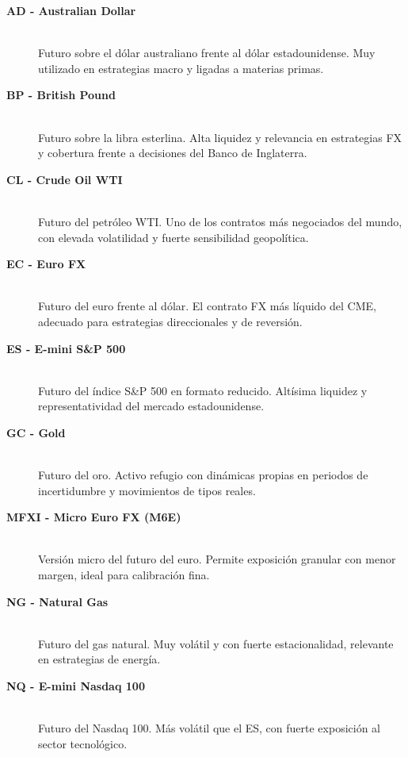 \begin{description}

    \item[\textbf{AD - Australian Dollar}] \hfill \\
    Futuro sobre el dólar australiano frente al dólar estadounidense. Muy utilizado en estrategias macro y ligadas a materias primas.

    \item[\textbf{BP - British Pound}] \hfill \\
    Futuro sobre la libra esterlina. Alta liquidez y relevancia en estrategias FX y cobertura frente a decisiones del Banco de Inglaterra.

    \item[\textbf{CL - Crude Oil WTI}] \hfill \\
    Futuro del petróleo WTI. Uno de los contratos más negociados del mundo, con elevada volatilidad y fuerte sensibilidad geopolítica.

    \item[\textbf{EC - Euro FX}] \hfill \\
    Futuro del euro frente al dólar. El contrato FX más líquido del CME, adecuado para estrategias direccionales y de reversión.

    \item[\textbf{ES - E-mini S\&P 500}] \hfill \\
    Futuro del índice S\&P 500 en formato reducido. Altísima liquidez y representatividad del mercado estadounidense.

    \item[\textbf{GC - Gold}] \hfill \\
    Futuro del oro. Activo refugio con dinámicas propias en periodos de incertidumbre y movimientos de tipos reales.

    \item[\textbf{MFXI - Micro Euro FX (M6E)}] \hfill \\
    Versión micro del futuro del euro. Permite exposición granular con menor margen, ideal para calibración fina.

    \item[\textbf{NG - Natural Gas}] \hfill \\
    Futuro del gas natural. Muy volátil y con fuerte estacionalidad, relevante en estrategias de energía.

    \item[\textbf{NQ - E-mini Nasdaq 100}] \hfill \\
    Futuro del Nasdaq 100. Más volátil que el ES, con fuerte exposición al sector tecnológico.


\end{description}
